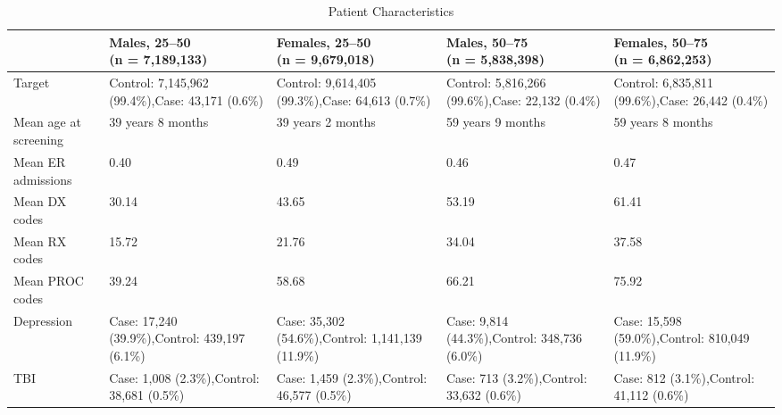 \begin{table}[!ht]
\centering
\fontsize{9}{10}\selectfont

\caption{Patient Characteristics}
\label{table_pat_char}

\begin{tabular}{
  |L{0.85in}|L{1.4in}|L{1.4in}|L{1.4in}|L{1.4in}|
}
\hline
{}
\textbf{} &
\textbf{Males, 25--50\newline (n = 7,189,133)} &
\textbf{Females, 25--50\newline (n = 9,679,018)} &
\textbf{Males, 50--75\newline (n = 5,838,398)} &
\textbf{Females, 50--75\newline (n = 6,862,253)} \\
\hline

Target &
Control: 7,145,962 (99.4\%),\newline Case: 43,171 (0.6\%) &
Control: 9,614,405 (99.3\%),\newline Case: 64,613 (0.7\%) &
Control: 5,816,266 (99.6\%),\newline Case: 22,132 (0.4\%) &
Control: 6,835,811 (99.6\%),\newline Case: 26,442 (0.4\%) \\
\hline

Mean age at screening &
39 years 8 months &
39 years 2 months &
59 years 9 months &
59 years 8 months \\
\hline

Mean ER admissions & 0.40 & 0.49 & 0.46 & 0.47 \\
\hline
Mean DX codes & 30.14 & 43.65 & 53.19 & 61.41 \\
\hline
Mean RX codes & 15.72 & 21.76 & 34.04 & 37.58 \\
\hline
Mean PROC codes & 39.24 & 58.68 & 66.21 & 75.92 \\
\hline

Depression &
Case: 17,240 (39.9\%),\newline Control: 439,197 (6.1\%) &
Case: 35,302 (54.6\%),\newline Control: 1,141,139 (11.9\%) &
Case: 9,814 (44.3\%),\newline Control: 348,736 (6.0\%) &
Case: 15,598 (59.0\%),\newline Control: 810,049 (11.9\%) \\
\hline

TBI &
Case: 1,008 (2.3\%),\newline Control: 38,681 (0.5\%) &
Case: 1,459 (2.3\%),\newline Control: 46,577 (0.5\%) &
Case: 713 (3.2\%),\newline Control: 33,632 (0.6\%) &
Case: 812 (3.1\%),\newline Control: 41,112 (0.6\%) \\
\hline


\end{tabular}
\end{table}

